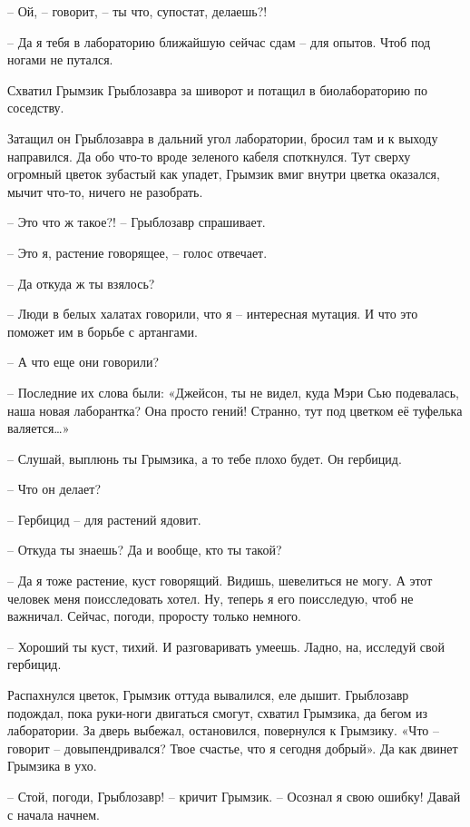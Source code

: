\documentclass[ebook,oneside,final,openright]{memoir}
\begin{document}
– Ой, – говорит, – ты что, супостат, делаешь?!\par
– Да я тебя в лабораторию ближайшую сейчас сдам – для опытов. Чтоб под ногами не путался.\par
Схватил Грымзик Грыблозавра за шиворот и потащил в биолабораторию по соседству.\par
\par
Затащил он Грыблозавра в дальний угол лаборатории, бросил там и к выходу направился. Да обо что-то вроде зеленого кабеля споткнулся. Тут сверху огромный цветок зубастый как упадет, Грымзик вмиг внутри цветка оказался, мычит что-то, ничего не разобрать.\par
\par
– Это что ж такое?! – Грыблозавр спрашивает.\par
– Это я, растение говорящее, – голос отвечает.\par
– Да откуда ж ты взялось?\par
– Люди в белых халатах говорили, что я – интересная мутация. И что это поможет им в борьбе с артангами.\par
– А что еще они говорили?\par
– Последние их слова были: «Джейсон, ты не видел, куда Мэри Сью подевалась, наша новая лаборантка? Она просто гений! Странно, тут под цветком её туфелька валяется…»\par
– Слушай, выплюнь ты Грымзика, а то тебе плохо будет. Он гербицид.\par
– Что он делает?\par
– Гербицид – для растений ядовит.\par
– Откуда ты знаешь? Да и вообще, кто ты такой?\par
– Да я тоже растение, куст говорящий. Видишь, шевелиться не могу. А этот человек меня поисследовать хотел. Ну, теперь я его поисследую, чтоб не важничал. Сейчас, погоди, проросту только немного.\par
– Хороший ты куст, тихий. И разговаривать умеешь. Ладно, на, исследуй свой гербицид.\par
\par
Распахнулся цветок, Грымзик оттуда вывалился, еле дышит. Грыблозавр подождал, пока руки-ноги двигаться смогут, схватил Грымзика, да бегом из лаборатории. За дверь выбежал, остановился, повернулся к Грымзику. «Что – говорит – довыпендривался? Твое счастье, что я сегодня добрый». Да как двинет Грымзика в ухо.\par
\par
– Стой, погоди, Грыблозавр! – кричит Грымзик. – Осознал я свою ошибку! Давай с начала начнем.\par
\end{document}
